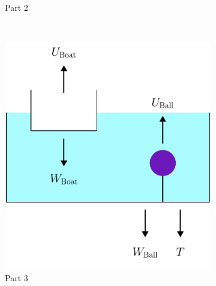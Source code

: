 \begin{figure}[H]
\begin{subfigure}{0.49\textwidth}
        \caption{Part 2}
        \label{fig:TheBallAndTheBoat_Case2}
    \end{subfigure}  \\
    \vspace{10mm}
    \begin{subfigure}{0.49\textwidth}
        \includegraphics[width=\textwidth]{5 - Physics/TheBallAndTheBoat_Case3.pdf}
        \caption{Part 3}
        \label{fig:TheBallAndTheBoat_Case3}
    \end{subfigure}
    \hfill
    \begin{subfigure}{0.49\textwidth}

\end{subfigure}
\end{figure}
